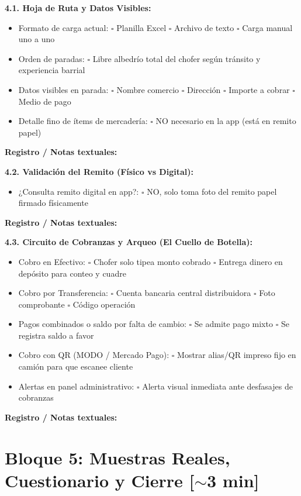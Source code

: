 \documentclass[10pt,a4paper]{article}
\newcommand{\espacioNotas}[1]{%
  \vspace{2pt}%
  \noindent\textbf{\footnotesize Registro / Notas textuales:}\par
  \noindent\fbox{%
    \parbox{\dimexpr\textwidth-2\fboxsep-2\fboxrule\relax}{%
      \vspace{#1pt}%
    }%
  }%
  \vspace{3pt}%
}
\begin{document}
\noindent
\textbf{4.1. Hoja de Ruta y Datos Visibles:}
\begin{itemize}
  \item Formato de carga actual: \quad $\square$ Planilla Excel \quad $\square$ Archivo de texto \quad $\square$ Carga manual uno a uno
  \item Orden de paradas: \quad $\square$ Libre albedrío total del chofer según tránsito y experiencia barrial
  \item Datos visibles en parada: \quad $\square$ Nombre comercio \quad $\square$ Dirección \quad $\square$ Importe a cobrar \quad $\square$ Medio de pago
  \item Detalle fino de ítems de mercadería: \quad $\square$ NO necesario en la app (está en remito papel)
\end{itemize}
\espacioNotas{26}

\noindent
\textbf{4.2. Validación del Remito (Físico vs Digital):}
\begin{itemize}
  \item ¿Consulta remito digital en app?: \quad $\square$ NO, solo toma foto del remito papel firmado físicamente
\end{itemize}
\espacioNotas{22}

\clearpage

\noindent
\textbf{4.3. Circuito de Cobranzas y Arqueo (El Cuello de Botella):}
\begin{itemize}
  \item Cobro en Efectivo: \quad $\square$ Chofer solo tipea monto cobrado \quad $\square$ Entrega dinero en depósito para conteo y cuadre
  \item Cobro por Transferencia: \quad $\square$ Cuenta bancaria central distribuidora \quad $\square$ Foto comprobante \quad $\square$ Código operación
  \item Pagos combinados o saldo por falta de cambio: \quad $\square$ Se admite pago mixto \quad $\square$ Se registra saldo a favor
  \item Cobro con QR (MODO / Mercado Pago): \quad $\square$ Mostrar alias/QR impreso fijo en camión para que escanee cliente
  \item Alertas en panel administrativo: \quad $\square$ Alerta visual inmediata ante desfasajes de cobranzas
\end{itemize}
\espacioNotas{34}

\section*{Bloque 5: Muestras Reales, Cuestionario y Cierre [$\sim$3 min]}
\end{document}
